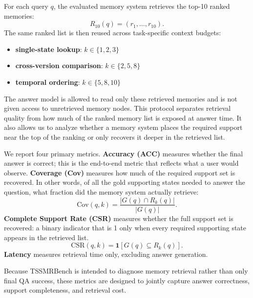 For each query $q$, the evaluated memory system retrieves the top-10 ranked memories:
\[
R_{10}(q) = (r_1, \ldots, r_{10}).
\]
The same ranked list is then reused across task-specific context budgets:
\begin{itemize}[leftmargin=*]
\item \textbf{single-state lookup}: $k \in \{1,2,3\}$
\item \textbf{cross-version comparison}: $k \in \{2,5,8\}$
\item \textbf{temporal ordering}: $k \in \{5,8,10\}$
\end{itemize}

The answer model is allowed to read only these retrieved memories and is not given access to unretrieved memory nodes. This protocol separates retrieval quality from how much of the ranked memory list is exposed at answer time. It also allows us to analyze whether a memory system places the required support near the top of the ranking or only recovers it deeper in the retrieved list.

We report four primary metrics. \textbf{Accuracy (ACC)} measures whether the final answer is correct; this is the end-to-end metric that reflects what a user would observe. \textbf{Coverage (Cov)} measures how much of the required support set is recovered. In other words, of all the gold supporting states needed to answer the question, what fraction did the memory system actually retrieve:
\[
\mathrm{Cov}(q,k) = \frac{|G(q)\cap R_k(q)|}{|G(q)|}.
\]
\textbf{Complete Support Rate (CSR)} measures whether the full support set is recovered: a binary indicator that is 1 only when every required supporting state appears in the retrieved list.
\[
\mathrm{CSR}(q,k) = \mathbf{1}[G(q)\subseteq R_k(q)].
\]
\textbf{Latency} measures retrieval time only, excluding answer generation.

Because TSSMRBench is intended to diagnose memory retrieval rather than only final QA success, these metrics are designed to jointly capture answer correctness, support completeness, and retrieval cost.
